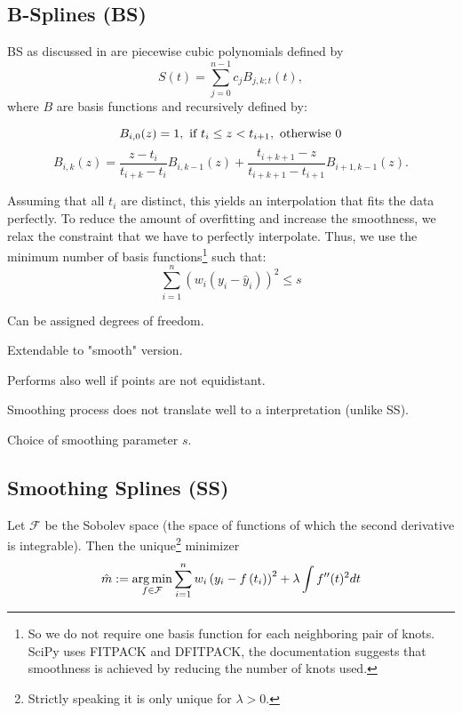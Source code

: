 	\subsection{B-Splines (BS)}
		\label{sec:B}
		BS as discussed in \cite{lycheSplineMethods2005} are piecewise cubic polynomials defined by 
		$$
			S(t)=\sum_{j=0}^{n-1} c_{j} B_{j, k ; t}(t),
		$$
		where $B$ are basis functions and recursively defined by:
		
		\begin{equation}
				B_{i, 0}(z)=1, \text { if } t_{i} \leq z<t_{i+1}, \text { otherwise } 0 \\
		\end{equation}
		\begin{equation}
			B_{i, k}(z)=\frac{z-t_{i}}{t_{i+k}-t_{i}} B_{i, k-1}(z)+\frac{t_{i+k+1}-z}{t_{i+k+1}-t_{i+1}} B_{i+1, k-1}(z).
		\end{equation}
		
		Assuming that all $t_i$ are distinct, this yields an interpolation that fits the data perfectly. To reduce the amount of overfitting and increase the smoothness, we relax the constraint that we have to perfectly interpolate. Thus, we use the minimum number of basis functions\footnote{So we do not require one basis function for each neighboring pair of knots. SciPy uses FITPACK and DFITPACK, the documentation suggests that smoothness is achieved by reducing the number of knots used.} such that:
		$$\sum_{i=1}^n(w_i (y_i - \hat y_i))^2 \leq s$$

		\begin{my_pros_cons_table}{
				\item Can be assigned degrees of freedom.
				\item Extendable to "smooth" version.
				\item Performs also well if points are not equidistant.
			}{
				\item Smoothing process does not translate well to a interpretation (unlike SS).
				\item Choice of smoothing parameter $s$.
			}
		\end{my_pros_cons_table}


	\subsection{Smoothing Splines (SS)}
		\label{sec:Natural_SS}
		Let $\mathcal F$ be the Sobolev space (the space of functions of which the second derivative is integrable). Then the unique\footnote{Strictly speaking it is only unique for $\lambda > 0$.} minimizer
		\begin{equation}
			\label{eq:ss}
			\hat m :=\operatorname*{arg\, min}_{f \in \mathcal F} \sum_{i=1}^{n}w_i\left(y_{i}-{f}\left(t_{i}\right)\right)^{2}+\lambda \int {f}^{\prime \prime}(t)^{2} dt
		\end{equation}
			
